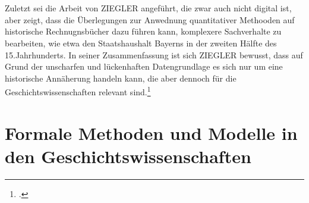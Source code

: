\documentclass[12pt,a4paper]{article}
\begin{document}
\\
\\
Zuletzt sei die Arbeit von ZIEGLER angeführt, die zwar auch nicht digital ist, aber zeigt, dass die Überlegungen zur Anwednung quantitativer Methooden auf historische Rechnugnsbücher dazu führen kann, komplexere Sachverhalte zu bearbeiten, wie etwa den Staatshaushalt Bayerns in der zweiten Hälfte des 15.Jahrhunderts. In seiner Zusammenfassung ist sich ZIEGLER bewusst, dass auf Grund der unscharfen und lückenhaften Datengrundlage es sich nur um eine historische Annäherung handeln kann, die aber dennoch für die Geschichtswissenschaften relevant sind.\footcite[][S.221-230]{ziegler1981Staatshaushalt}

\newpage
\section{Formale Methoden und Modelle in den Geschichtswissenschaften}
\end{document}
